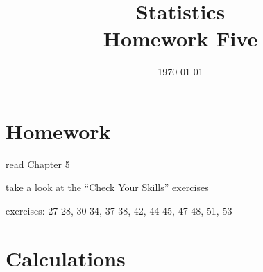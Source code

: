\documentclass[letterpaper, landscape]{exam}
\title{Statistics \\ Homework Five}
\date{\today}
\author{}
\begin{document}
  \maketitle

  \section{Homework}
    \begin{itemize*}
      \item read Chapter 5 
      \item take a look at the ``Check Your Skills'' exercises
      \item exercises: 27-28, 30-34, 37-38, 42, 44-45, 47-48, 51, 53
    \end{itemize*}

  \ifprintanswers
  \else
    \section{Calculations}
  \fi
\end{document}
